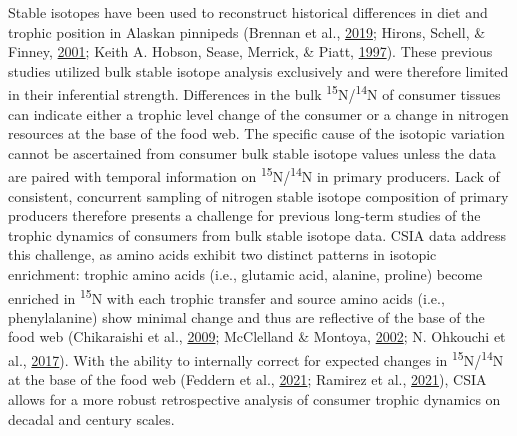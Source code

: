 \documentclass [11pt, proquest] {uwthesis}[2015/03/03]
\begin{document}
Stable isotopes have been used to reconstruct historical differences in
diet and trophic position in Alaskan pinnipeds (Brennan et al.,
\protect\hyperlink{ref-Brennan2019}{2019}; Hirons, Schell, \& Finney,
\protect\hyperlink{ref-Hirons2001}{2001}; Keith A. Hobson, Sease,
Merrick, \& Piatt, \protect\hyperlink{ref-Hobson1997}{1997}). These
previous studies utilized bulk stable isotope analysis exclusively and
were therefore limited in their inferential strength. Differences in the
bulk \textsuperscript{15}N/\textsuperscript{14}N of consumer tissues can
indicate either a trophic level change of the consumer or a change in
nitrogen resources at the base of the food web. The specific cause of
the isotopic variation cannot be ascertained from consumer bulk stable
isotope values unless the data are paired with temporal information on
\textsuperscript{15}N/\textsuperscript{14}N in primary producers. Lack
of consistent, concurrent sampling of nitrogen stable isotope
composition of primary producers therefore presents a challenge for
previous long-term studies of the trophic dynamics of consumers from
bulk stable isotope data. CSIA data address this challenge, as amino
acids exhibit two distinct patterns in isotopic enrichment: trophic
amino acids (i.e., glutamic acid, alanine, proline) become enriched in
\textsuperscript{15}N with each trophic transfer and source amino acids
(i.e., phenylalanine) show minimal change and thus are reflective of the
base of the food web (Chikaraishi et al.,
\protect\hyperlink{ref-Chikaraishi2009}{2009}; McClelland \& Montoya,
\protect\hyperlink{ref-McClelland2002}{2002}; N. Ohkouchi et al.,
\protect\hyperlink{ref-Ohkouchi2017}{2017}). With the ability to
internally correct for expected changes in
\textsuperscript{15}N/\textsuperscript{14}N at the base of the food web
(Feddern et al., \protect\hyperlink{ref-Feddern2021}{2021}; Ramirez et
al., \protect\hyperlink{ref-Ramirez2021}{2021}), CSIA allows for a more
robust retrospective analysis of consumer trophic dynamics on decadal
and century scales.
\end{document}
